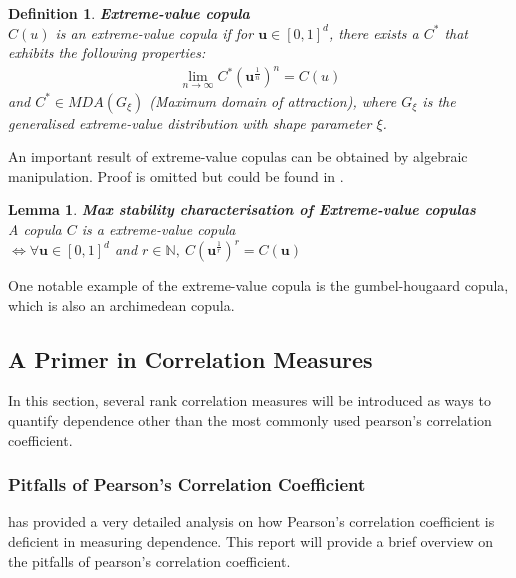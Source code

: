 \documentclass[12pt]{report}
\newtheorem{lemma}{Lemma}[subsection]
\newtheorem{definition}{Definition}[subsection]
\newcommand{\1}{\mathbf{1}}
\begin{document}
\begin{flushleft}
\begin{definition}\label{ExtremeValueDefinition}
\textit{\normalfont\parencite{HofertBook}} \:\textbf{Extreme-value copula} \\

$C(u)$ is an extreme-value copula if for $\textbf{u} \in [0,1]^{d}$, there exists a $C^{*}$ that exhibits the following properties: 
\begin{align*}
\lim_{n \rightarrow \infty} C^{*}(\textbf{u}^{\frac{1}{n}})^{n} = C(u)
\end{align*}
and $C^{*} \in MDA(G_{\xi})$ (Maximum domain of attraction), where $G_{\xi}$ is the generalised extreme-value distribution with shape parameter $\xi$.
\end{definition}

An important result of extreme-value copulas can be obtained by algebraic manipulation. Proof is omitted but could be found in \cite{HofertBook}.\\

\begin{lemma}\label{MaxStability}
\textit{\normalfont\parencite{HofertBook}} \:\textbf{Max stability characterisation of Extreme-value copulas}\\

A copula $C$ is a extreme-value copula \\
$\iff \forall \textbf{u} \in [0,1]^{d}$ and $r \in \mathbb{N}, \: C(\textbf{u}^{\frac{1}{r}})^{r} = C(\textbf{u})$

\end{lemma}
One notable example of the extreme-value copula is the gumbel-hougaard copula, which is also an archimedean copula.\\

\newpage
\subsection{A Primer in Correlation Measures}
\vspace{0.5cm}
In this section, several rank correlation measures will be introduced as ways to quantify dependence other than the most commonly used pearson's correlation coefficient.

\subsubsection{Pitfalls of Pearson's Correlation Coefficient}
\vspace{0.5cm}
\:\cite{HofertBook} has provided a very detailed analysis on how Pearson's correlation coefficient is deficient in measuring dependence. This report will provide a brief overview on the pitfalls of pearson's correlation coefficient.


\end{flushleft}
\end{document}
